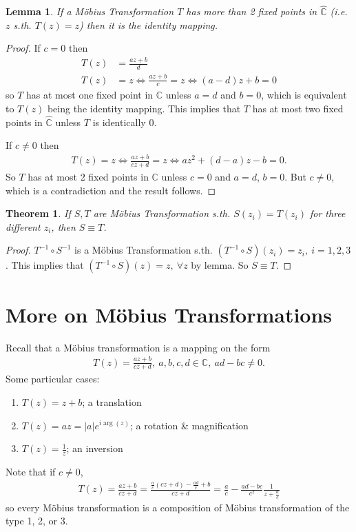 \documentclass[12pt, a4paper]{article}
\theoremstyle{plain}
\newtheorem{thm}{Theorem} %
\newtheorem{lemma}{Lemma}
\theoremstyle{definition}
\begin{document}
			\begin{lemma}
				If a Möbius Transformation $T$ has more than 2 fixed points in $\hat{\mathbb{C}}$ (i.e. $z$ s.th. $T(z)=z$) then it is the identity mapping.
			\end{lemma}

			\begin{proof}
				If $c=0$ then
				\begin{align*}
					T(z) &= \frac{az+b}{d}\\
					T(z) &= z \iff \frac{az+b}{c} = z \iff (a-d)z + b = 0
				\end{align*}
				so $T$ has at most one fixed point in $\mathbb{C}$ unless $a=d$ and $b=0$, which is equivalent to $T(z)$ being the identity mapping. This implies that $T$ has at most two fixed points in $\hat{\mathbb{C}}$ unless $T$ is identically 0.

				If $c\not=0$ then
				\begin{align*}
					T(z) = z \iff \frac{az+b}{cz+d}=z \iff az^2+(d-a)z-b = 0.
				\end{align*}
				So $T$ has at most 2 fixed points in $\mathbb{C}$ unless $c=0$ and $a=d$, $b=0$. But $c\not = 0$, which is a contradiction and the result follows.
			\end{proof}

			\begin{thm}
				If $S,T$ are Möbius Transformation s.th. $S(z_i) = T(z_i)$ for three different $z_i$, then $S\equiv T$.
			\end{thm}

			\begin{proof}
				$T^{-1}\circ S^{-1}$ is a Möbius Transformation s.th. $(T^{-1}\circ S)(z_i) = z_i,\:i=1,2,3$. This implies that $(T^{-1}\circ S)(z) = z,\:\forall z$ by lemma. So $S\equiv T$.
			\end{proof}
	\section{More on Möbius Transformations} %
	\label{sec:more_on_möbius_transformations}
		Recall that a Möbius transformation is a mapping on the form
		\begin{align*}
			T(z) = \frac{az+b}{cz+d},\:a,b,c,d \in \mathbb{C},\: ad-bc\not=0.
		\end{align*}
		Some particular cases:
		\begin{enumerate}
			\item $T(z) = z+b$; a translation
			\item $T(z) = az = |a|e^{i\arg(z)}$; a rotation \& magnification
			\item $T(z) = \frac{1}{z}$; an inversion  
		\end{enumerate}
		Note that if $c\not=0$,
		\begin{align*}
			T(z) = \frac{az+b}{cz+d} = \frac{\frac{a}{c}(cz+d)-\frac{ad}{c}+b}{cz+d} = \frac{a}{c} - \frac{ad-bc}{c^2}\frac{1}{z+\frac{d}{c}}
		\end{align*}
		so every Möbius transformation is a composition of Möbius transformation of the type 1, 2, or 3.
\end{document}
